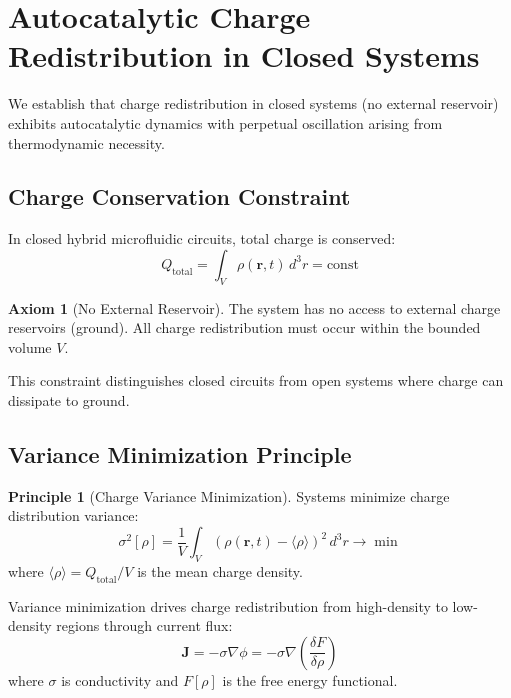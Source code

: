 \documentclass[12pt,a4paper]{article}
\theoremstyle{plain}
\theoremstyle{definition}
\newtheorem{axiom}[theorem]{Axiom}
\newtheorem{principle}[theorem]{Principle}
\theoremstyle{remark}
\begin{document}
\section{Autocatalytic Charge Redistribution in Closed Systems}
\label{sec:autocatalytic}

We establish that charge redistribution in closed systems (no external reservoir) exhibits autocatalytic dynamics with perpetual oscillation arising from thermodynamic necessity.

\subsection{Charge Conservation Constraint}

In closed hybrid microfluidic circuits, total charge is conserved:
\begin{equation}
Q_{\text{total}} = \int_V \rho(\mathbf{r},t) \, d^3r = \text{const}
\label{eq:charge_conservation_closed}
\end{equation}

\begin{axiom}[No External Reservoir]
\label{ax:no_ground}
The system has no access to external charge reservoirs (ground). All charge redistribution must occur within the bounded volume $V$.
\end{axiom}

This constraint distinguishes closed circuits from open systems where charge can dissipate to ground.

\subsection{Variance Minimization Principle}

\begin{principle}[Charge Variance Minimization]
\label{prin:variance_min}
Systems minimize charge distribution variance:
\begin{equation}
\sigma^2[\rho] = \frac{1}{V} \int_V (\rho(\mathbf{r},t) - \langle \rho \rangle)^2 \, d^3r \to \min
\end{equation}
where $\langle \rho \rangle = Q_{\text{total}} / V$ is the mean charge density.
\end{principle}

Variance minimization drives charge redistribution from high-density to low-density regions through current flux:
\begin{equation}
\mathbf{J} = -\sigma \nabla \phi = -\sigma \nabla \left( \frac{\delta F}{\delta \rho} \right)
\end{equation}
where $\sigma$ is conductivity and $F[\rho]$ is the free energy functional.
\end{document}
